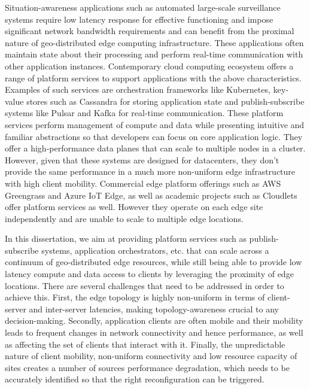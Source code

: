 \begin{summary}
Situation-awareness applications such as automated large-scale surveillance systems require low latency response for effective functioning and impose significant network bandwidth requirements and can benefit from the proximal nature of geo-distributed edge computing infrastructure. 
These applications often maintain state about their processing and perform real-time communication with other application instances. 
Contemporary cloud computing ecosystem offers a range of platform services to support applications with the above characteristics. Examples of such services are orchestration frameworks like Kubernetes, key-value stores such as Cassandra for storing application state and publish-subscribe systems like Pulsar and Kafka for real-time communication. These platform services perform management of compute and data while presenting intuitive and familiar abstractions so that developers can focus on core application logic. They offer a high-performance data planes that can scale to multiple nodes in a cluster. However, given that these systems are designed for datacenters, they don't provide the same performance in a much more non-uniform edge infrastructure with high client mobility. Commercial edge platform offerings such as AWS Greengrass and Azure IoT Edge, as well as academic projects such as Cloudlets offer platform services as well. However they operate on each edge site independently and are unable to scale to multiple edge locations.  
\par In this dissertation, we aim at providing platform services such as publish-subscribe systems, application orchestrators, etc. that can scale across a continuum of geo-distributed edge resources, while still being able to provide low latency compute and data access to clients by leveraging the proximity of edge locations. There are several challenges that need to be addressed in order to achieve this. First, the edge topology is highly non-uniform in terms of client-server and inter-server latencies, making topology-awareness crucial to any decision-making. Secondly, application clients are often mobile and their mobility leads to frequent changes in network connectivity and hence performance, as well as affecting the set of clients that interact with it. Finally, the unpredictable nature of client mobility, non-uniform connectivity and low resource capacity of sites creates a number of sources performance degradation, which needs to be accurately identified so that the right reconfiguration can be triggered. 


\end{summary}
